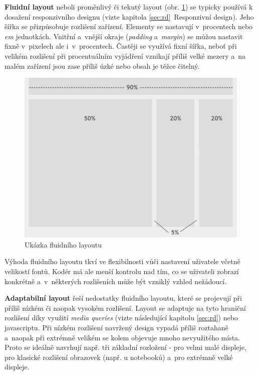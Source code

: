 \documentclass[thesis=B,czech]{FITthesis}[2012/06/26]
\begin{document}

\textbf{Fluidní layout} neboli proměnlivý či tekutý layout (obr. \ref{imgFluid}) se typicky používá k dosažení responzivního designu (vizte kapitola \ref{sec:rd}~Responzivní design). Jeho šířka se přizpůsobuje rozlišení zařízení. Elementy se nastavují v~procentech nebo \textit{em} jednotkách. Vnitřní a~vnější okraje (\textit{padding} a~\textit{margin}) se můžou nastavit fixně v~pixelech ale i~v~procentech. Častěji se využívá fixní šířka, neboť při velikém rozlišení při procentuálním vyjádření vznikají příliš velké mezery a~na malém zařízení jsou zase příliš úzké nebo obsah je těžce čitelný\cite{fix}.

\begin{figure}[h]
	\begin{center}
	\includegraphics[scale=0.5]{images/image21.jpg}
	\end{center}
	\caption{Ukázka fluidního layoutu \cite{fix}}
	\label{imgFluid}
\end{figure}

Výhoda fluidního layoutu tkví ve flexibilnosti vůči nastavení uživatele včetně velikostí fontů. Kodér má ale menší kontrolu nad tím, co se uživateli zobrazí konkrétně a~v~některých rozlišeních může být vzniklý vzhled nežádoucí.

\textbf{Adaptabilní layout} řeší nedostatky fluidního layoutu, které se projevují při příliš nízkém či naopak vysokém rozlišení. Layout se adaptuje na tyto hraniční rozlišení díky využití \textit{media queries} (vizte následující kapitolu \ref{sec:rd}) nebo javascriptu. Při nízkém rozlišení navržený design vypadá příliš roztahaně a~naopak při extrémně velikém se kolem objevuje mnoho nevyužitého místa. Proto se ideálně navrhují např. tři základní rozložení - pro velmi malé displeje, pro klasické rozlišení obrazovek (např. u notebooků) a~pro extrémně velké displeje\cite{adapt}.
\end{document}

